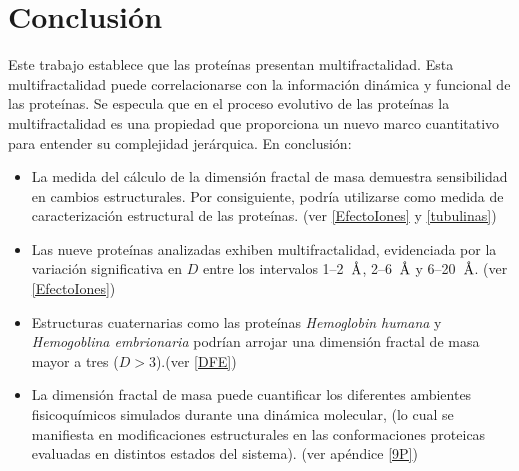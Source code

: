 \chapter{Conclusi\'{o}n}


\color{blue}

Este trabajo establece que las prote\'{i}nas presentan multifractalidad. Esta multifractalidad puede correlacionarse con la informaci\'{o}n din\'{a}mica y funcional de las prote\'{i}nas. Se especula que en el proceso evolutivo de las prote\'{i}nas la multifractalidad es una propiedad que proporciona un nuevo marco cuantitativo para entender su complejidad jer\'{a}rquica. En conclusi\'{o}n:


\begin{itemize}
	\item La medida del c\'{a}lculo de la dimensi\'{o}n fractal de masa demuestra sensibilidad en
	 cambios estructurales. Por consiguiente, podr\'{i}a utilizarse como medida de caracterizaci\'{o}n estructural de las prote\'{i}nas. (ver \ref{EfectoIones} y \ref{tubulinas})
	
	\item Las nueve prote\'{i}nas analizadas exhiben multifractalidad, evidenciada por la variaci\'{o}n 
	significativa en $D$ entre los intervalos 1--2~$\textup{\r{A}}$, 2--6~$\textup{\r{A}}$ y 6--20~$\textup{\r{A}}$. (ver \ref{EfectoIones})
	
	\item Estructuras cuaternarias como las prote\'{i}nas \textit{Hemoglobin humana} y \textit{Hemogoblina embrionaria} podr\'{i}an arrojar una dimensi\'{o}n fractal de masa mayor a tres ($D>3$).(ver \ref{DFE})
	
	
	\item La dimensi\'{o}n fractal de masa puede cuantificar los diferentes ambientes fisicoqu\'{i}micos simulados durante una din\'{a}mica molecular, (lo cual se manifiesta en modificaciones estructurales en las conformaciones proteicas evaluadas en distintos estados del sistema). (ver apéndice \ref{9P})
	
 \color{black}
 
\end{itemize}



